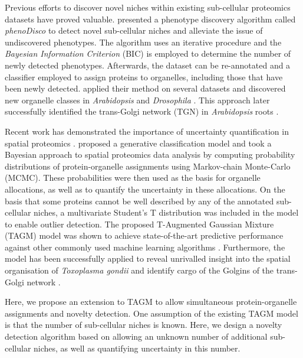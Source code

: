 \documentclass[12pt,english]{article}
\begin{document}
Previous efforts to discover novel niches within existing sub-cellular proteomics datasets have proved valuable. \cite{Breckels:2013} presented a phenotype discovery algorithm called \textit{phenoDisco} to detect novel sub-cellular niches and alleviate the issue of undiscovered phenotypes. The algorithm uses an iterative procedure and the \textit{Bayesian Information Criterion} (BIC) \citep{Schwarz::1978} is employed to determine the number of newly detected phenotypes. Afterwards, the dataset can be re-annotated and a classifier employed to assign proteins to organelles, including those that have been newly detected. \cite{Breckels:2013} applied their method on several datasets and discovered new organelle classes in \textit{Arabidopsis} \citep{Dunkley:2006} and \textit{Drosophila} \citep{Tan:2009}. This approach later successfully identified the trans-Golgi network (TGN) in \textit{Arabidopsis} roots \citep{Groen:2014}.

Recent work has demonstrated the importance of uncertainty quantification in spatial proteomics \citep{Crook:2018,Crook::2019b, Crook::2019a}. \cite{Crook:2018} proposed a generative classification model and took a Bayesian approach to spatial proteomics data analysis by computing probability distributions of protein-organelle assignments using Markov-chain Monte-Carlo (MCMC). These probabilities were then used as the basis for organelle allocations, as well as to quantify the uncertainty in these allocations. On the basis that some proteins cannot be well described by any of the annotated sub-cellular niches, a multivariate Student's T distribution was included in the model to enable outlier detection. The proposed T-Augmented Gaussian Mixture (TAGM) model was shown to achieve state-of-the-art predictive performance against other commonly used machine learning algorithms \citep{Crook:2018}. Furthermore, the model has been successfully applied to reveal unrivalled insight into the spatial organisation of \textit{Toxoplasma gondii} \citep{Barylyuk::2020} and identify cargo of the Golgins of the trans-Golgi network \citep{Shin::2019}.

Here, we propose an extension to TAGM to allow simultaneous protein-organelle assignments and novelty detection. One assumption of the existing TAGM model is that the number of sub-cellular niches is known. Here, we design a novelty detection algorithm based on allowing an unknown number of additional sub-cellular niches, as well as quantifying uncertainty in this number.
\end{document}
